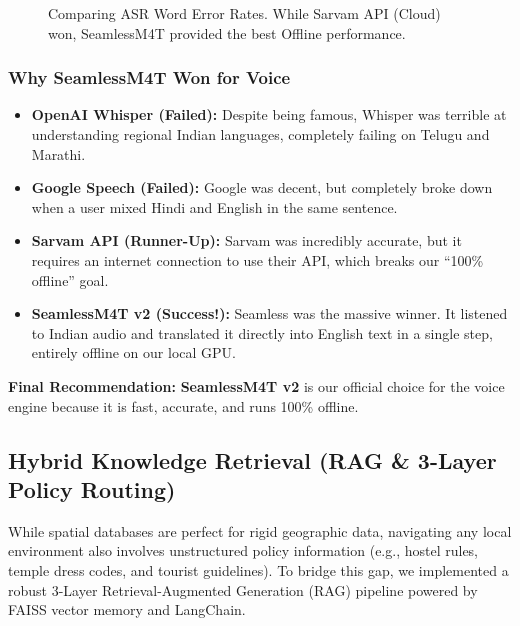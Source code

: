 \documentclass[11pt,a4paper]{article}
\begin{document}
\begin{figure}[H]
\centering
{}
\caption{Comparing ASR Word Error Rates. While Sarvam API (Cloud) won, SeamlessM4T provided the best Offline performance.}
\end{figure}

\subsubsection{Why SeamlessM4T Won for Voice}
\begin{itemize}
    \item \textbf{OpenAI Whisper (Failed):} Despite being famous, Whisper was terrible at understanding regional Indian languages, completely failing on Telugu and Marathi.
    \item \textbf{Google Speech (Failed):} Google was decent, but completely broke down when a user mixed Hindi and English in the same sentence.
    \item \textbf{Sarvam API (Runner-Up):} Sarvam was incredibly accurate, but it requires an internet connection to use their API, which breaks our ``100\% offline'' goal.
    \item \textbf{SeamlessM4T v2 (Success!):} Seamless was the massive winner. It listened to Indian audio and translated it directly into English text in a single step, entirely offline on our local GPU.
\end{itemize}

\textbf{Final Recommendation:} \textbf{SeamlessM4T v2} is our official choice for the voice engine because it is fast, accurate, and runs 100\% offline.

\subsection{Hybrid Knowledge Retrieval (RAG \& 3-Layer Policy Routing)}
While spatial databases are perfect for rigid geographic data, navigating any local environment also involves unstructured policy information (e.g., hostel rules, temple dress codes, and tourist guidelines). To bridge this gap, we implemented a robust 3-Layer Retrieval-Augmented Generation (RAG) pipeline powered by FAISS vector memory and LangChain. 
\end{document}
